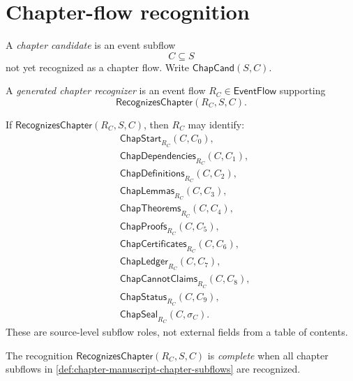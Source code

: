 \section{Chapter-flow recognition}
\label{sec:chapter-manuscript-chapter-flow}

\begin{definition}
\label{def:chapter-manuscript-chapter-candidate-recognizer}
A \emph{chapter candidate} is an event subflow
$$
  C\subseteq S
$$
not yet recognized as a chapter flow. Write $\mathsf{ChapCand}(S,C)$.

A \emph{generated chapter recognizer} is an event flow $R_C\in\mathsf{EventFlow}$ supporting
$$
  \mathsf{RecognizesChapter}(R_C,S,C).
$$
\end{definition}

\begin{definition}
\label{def:chapter-manuscript-chapter-subflows}
If $\mathsf{RecognizesChapter}(R_C,S,C)$, then $R_C$ may identify:
$$
\begin{aligned}
  &\mathsf{ChapStart}_{R_C}(C,C_0),\\
  &\mathsf{ChapDependencies}_{R_C}(C,C_1),\\
  &\mathsf{ChapDefinitions}_{R_C}(C,C_2),\\
  &\mathsf{ChapLemmas}_{R_C}(C,C_3),\\
  &\mathsf{ChapTheorems}_{R_C}(C,C_4),\\
  &\mathsf{ChapProofs}_{R_C}(C,C_5),\\
  &\mathsf{ChapCertificates}_{R_C}(C,C_6),\\
  &\mathsf{ChapLedger}_{R_C}(C,C_7),\\
  &\mathsf{ChapCannotClaims}_{R_C}(C,C_8),\\
  &\mathsf{ChapStatus}_{R_C}(C,C_9),\\
  &\mathsf{ChapSeal}_{R_C}(C,\sigma_C).
\end{aligned}
$$
These are source-level subflow roles, not external fields from a table of contents.
\end{definition}

\begin{definition}
\label{def:chapter-manuscript-complete-chapter-recognition}
The recognition $\mathsf{RecognizesChapter}(R_C,S,C)$ is \emph{complete} when all chapter subflows in \autoref{def:chapter-manuscript-chapter-subflows} are recognized.
\end{definition}

